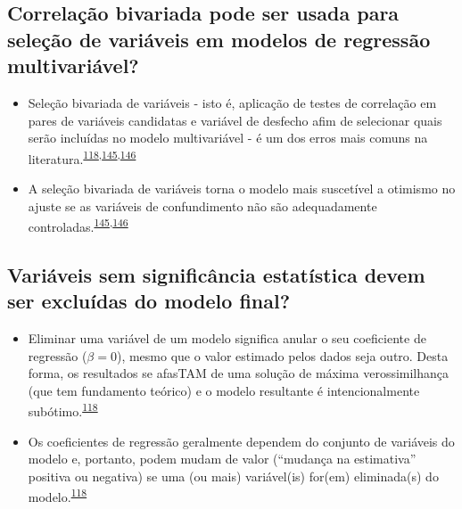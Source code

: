 \documentclass[
  a4paper,
]{book}
\begin{document}
\hypertarget{correlauxe7uxe3o-bivariada-pode-ser-usada-para-seleuxe7uxe3o-de-variuxe1veis-em-modelos-de-regressuxe3o-multivariuxe1vel}{%
\subsection{Correlação bivariada pode ser usada para seleção de variáveis em modelos de regressão multivariável?}\label{correlauxe7uxe3o-bivariada-pode-ser-usada-para-seleuxe7uxe3o-de-variuxe1veis-em-modelos-de-regressuxe3o-multivariuxe1vel}}

\begin{itemize}
\item
  Seleção bivariada de variáveis - isto é, aplicação de testes de correlação em pares de variáveis candidatas e variável de desfecho afim de selecionar quais serão incluídas no modelo multivariável - é um dos erros mais comuns na literatura.\textsuperscript{\protect\hyperlink{ref-heinze2016}{118},\protect\hyperlink{ref-Dales1978}{145},\protect\hyperlink{ref-Sun1996}{146}}
\item
  A seleção bivariada de variáveis torna o modelo mais suscetível a otimismo no ajuste se as variáveis de confundimento não são adequadamente controladas.\textsuperscript{\protect\hyperlink{ref-Dales1978}{145},\protect\hyperlink{ref-Sun1996}{146}}
\end{itemize}

\hypertarget{variuxe1veis-sem-significuxe2ncia-estatuxedstica-devem-ser-excluuxeddas-do-modelo-final}{%
\subsection{Variáveis sem significância estatística devem ser excluídas do modelo final?}\label{variuxe1veis-sem-significuxe2ncia-estatuxedstica-devem-ser-excluuxeddas-do-modelo-final}}

\begin{itemize}
\item
  Eliminar uma variável de um modelo significa anular o seu coeficiente de regressão (\(\beta = 0\)), mesmo que o valor estimado pelos dados seja outro. Desta forma, os resultados se afasTAM de uma solução de máxima verossimilhança (que tem fundamento teórico) e o modelo resultante é intencionalmente subótimo.\textsuperscript{\protect\hyperlink{ref-heinze2016}{118}}
\item
  Os coeficientes de regressão geralmente dependem do conjunto de variáveis do modelo e, portanto, podem mudam de valor (``mudança na estimativa'' positiva ou negativa) se uma (ou mais) variável(is) for(em) eliminada(s) do modelo.\textsuperscript{\protect\hyperlink{ref-heinze2016}{118}}
\end{itemize}
\end{document}
